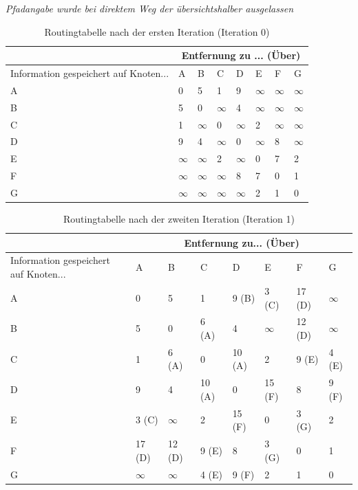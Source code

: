 \documentclass[12pt]{scrartcl}
\begin{document}
\setcounter{exnum}{2}
    \newcommand{\un}{$\infty$}
    \textit{Pfadangabe wurde bei direktem Weg der übersichtshalber ausgelassen}
    \begin{table}[h]
        \centering
        \begin{tabularx}{\textwidth}{|p{2.75cm}|X|X|X|X|X|X|X|}\hline
            & \multicolumn{7}{c|}{Entfernung zu ... (Über)} \\\hline
            Information gespeichert auf Knoten... 
                & A     & B     & C     & D     & E     & F     & G     \\\hline
            A   & 0     & 5     & 1     & 9     & \un   & \un   & \un   \\\hline 
            B   & 5     & 0     & \un   & 4     & \un   & \un   & \un   \\\hline
            C   & 1     & \un   & 0     & \un   & 2     & \un   & \un   \\\hline
            D   & 9     & 4     & \un   & 0     & \un   & 8     & \un   \\\hline
            E   & \un   & \un   & 2     & \un   & 0     & 7     & 2     \\\hline
            F   & \un   & \un   & \un   & 8     & 7     & 0     & 1     \\\hline
            G   & \un   & \un   & \un   & \un   & 2     & 1     & 0     \\\hline
        \end{tabularx}
        \caption{Routingtabelle nach der ersten Iteration (Iteration 0)}
    \end{table}
    \begin{table}[h]
        \centering
        \begin{tabularx}{\textwidth}{|p{2.75cm}|X|X|X|X|X|X|X|}\hline
            & \multicolumn{7}{c|}{Entfernung zu... (Über)} \\\hline
            Information gespeichert auf Knoten... 
                & A     & B     & C     & D     & E     & F     & G     \\\hline
            A   & 0     & 5     & 1     & 9 (B) & 3 (C) & 17 (D)& \un   \\\hline
            B   & 5     & 0     & 6 (A) & 4     & \un   & 12 (D)& \un   \\\hline
            C   & 1     & 6 (A) & 0     & 10 (A)& 2     & 9 (E) & 4 (E) \\\hline
            D   & 9     & 4     & 10 (A)& 0     & 15 (F)& 8     & 9 (F) \\\hline
            E   & 3 (C) & \un   & 2     & 15 (F)& 0     & 3 (G) & 2     \\\hline
            F   & 17 (D)& 12 (D)& 9 (E) & 8     & 3 (G) & 0     & 1     \\\hline
            G   & \un   & \un   & 4 (E) & 9 (F) & 2     & 1     & 0     \\\hline 
        \end{tabularx}
        \caption{Routingtabelle nach der zweiten Iteration (Iteration 1)}
    \end{table}
\end{document}

